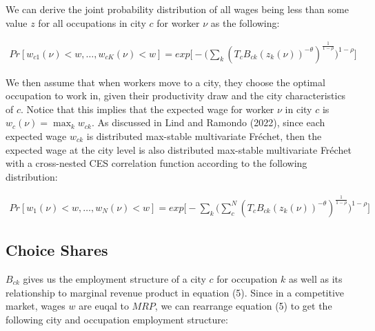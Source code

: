 \documentclass[10pt]{article}
\begin{document}
We can derive the joint probability distribution of all wages being less than some value $z$ for all occupations in city $c$ for worker $\nu$ as the following:

\begin{align}
    {Pr}[w_{c1}(\nu) < w, \dots, w_{cK}(\nu) < w] = {exp}\Big[-\Big(\sum_{k}({T_{c}}{B_{ck}}{(z_k(\nu))^{-\theta}})^{\frac{1}{1 - \rho}}\Big)^{1 - \rho}\Big]
\end{align}

We then assume that when workers move to a city, they choose the optimal occupation to work in, given their productivity draw and the city characteristics of $c$. Notice that this implies that the expected wage for worker $\nu$ in city $c$ is $w_{c}(\nu) = \max_{k}{w_{ck}}$. As discussed in Lind and Ramondo (2022), since each expected wage $w_{ck}$ is distributed max-stable multivariate Fréchet, then the expected wage at the city level is also distributed max-stable multivariate Fréchet with a cross-nested CES correlation function according to the following distribution:

\begin{align}
    {Pr}[w_{1}(\nu) < w, \dots, w_{N}(\nu) < w] = {exp}\Big[-\sum_{k}\Big(\sum_{c}^{N}({T_{c}}{B_{ck}}{(z_k(\nu))^{-\theta}})^{\frac{1}{1 - \rho}}\Big)^{1 - \rho}\Big]
\end{align}






\subsection{Choice Shares}

$B_{ck}$ gives us the employment structure of a city $c$ for occupation $k$ as well as its relationship to marginal revenue product in equation (5). Since in a competitive market, wages $w$ are euqal to $MRP$, we can rearrange equation (5) to get the following city and occupation employment structure:
\end{document}
